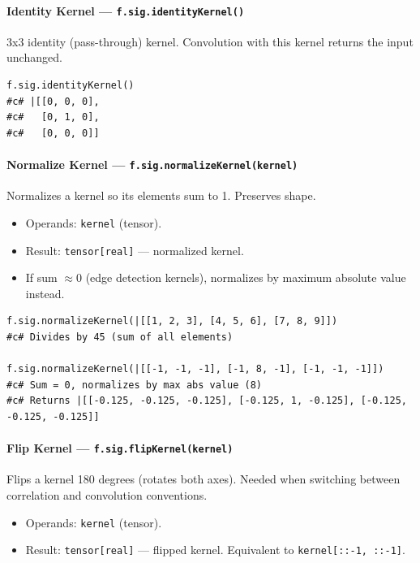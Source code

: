 \paragraph{Identity Kernel --- \texttt{f.sig.identityKernel()}}

3x3 identity (pass-through) kernel. Convolution with this kernel returns the input unchanged.

\begin{verbatim}
f.sig.identityKernel()
#c# |[[0, 0, 0],
#c#   [0, 1, 0],
#c#   [0, 0, 0]]
\end{verbatim}

\paragraph{Normalize Kernel --- \texttt{f.sig.normalizeKernel(kernel)}}

Normalizes a kernel so its elements sum to 1. Preserves shape.

\begin{itemize}
\item Operands: \texttt{kernel} (tensor).
\item Result: \texttt{tensor[real]} --- normalized kernel.
\item If sum $\approx 0$ (edge detection kernels), normalizes by maximum absolute value instead.
\end{itemize}

\begin{verbatim}
f.sig.normalizeKernel(|[[1, 2, 3], [4, 5, 6], [7, 8, 9]])
#c# Divides by 45 (sum of all elements)

f.sig.normalizeKernel(|[[-1, -1, -1], [-1, 8, -1], [-1, -1, -1]])
#c# Sum = 0, normalizes by max abs value (8)
#c# Returns |[[-0.125, -0.125, -0.125], [-0.125, 1, -0.125], [-0.125, -0.125, -0.125]]
\end{verbatim}

\paragraph{Flip Kernel --- \texttt{f.sig.flipKernel(kernel)}}

Flips a kernel 180 degrees (rotates both axes). Needed when switching between correlation and convolution conventions.

\begin{itemize}
\item Operands: \texttt{kernel} (tensor).
\item Result: \texttt{tensor[real]} --- flipped kernel. Equivalent to \texttt{kernel[::-1, ::-1]}.
\end{itemize}

